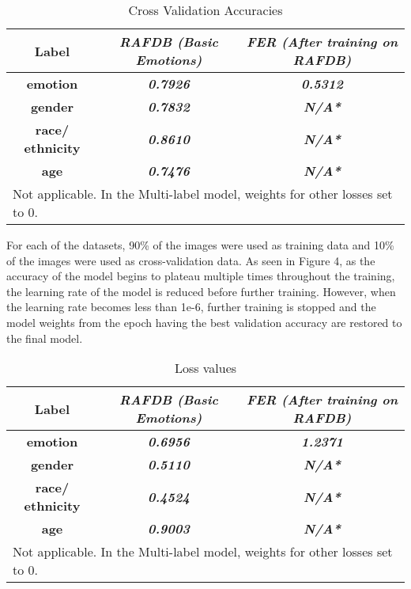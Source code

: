 \documentclass[letterpaper,10pt]{article}
\begin{document}
\begin{table}[htbp]

\begin{center}
\begin{tabular}{|c|c|c|}

\hline

\textbf{Label} & \textbf{\textit{RAFDB
 (Basic Emotions)}}& \textbf{\textit{FER (After training on RAFDB)}} \\
\hline
\textbf{emotion} & \textbf{\textit{0.7926}}& \textbf{\textit{0.5312}} \\
\hline
\textbf{gender} & \textbf{\textit{0.7832}}& \textbf{\textit{N/A*}} \\
\hline
\textbf{race/ ethnicity} & \textbf{\textit{0.8610 }}& \textbf{\textit{N/A*}} \\
\hline
\textbf{age} & \textbf{\textit{0.7476 }}& \textbf{\textit{N/A*}} \\
\hline
\multicolumn{3}{l}{Not applicable. In the Multi-label model, weights for other losses set to 0.
}

\end{tabular}
\label{tab1}
\end{center}
\caption{Cross Validation Accuracies}
\end{table}
For each of the datasets, 90\% of the images were used as training data and 10\% of the images were used as cross-validation data. As seen in Figure 4, as the accuracy of the model begins to plateau multiple times throughout the training, the learning rate of the model is reduced before further training. However, when the learning rate becomes less than 1e-6, further training is stopped and the model weights from the epoch having the best validation accuracy are restored to the final model.
\begin{table}[htbp]

\begin{center}
\begin{tabular}{|c|c|c|}

\hline

\textbf{Label} & \textbf{\textit{RAFDB
 (Basic Emotions)}}& \textbf{\textit{FER (After training on RAFDB)}} \\
\hline
\textbf{emotion} & \textbf{\textit{0.6956}}& \textbf{\textit{1.2371}} \\
\hline
\textbf{gender} & \textbf{\textit{0.5110}}& \textbf{\textit{N/A*}} \\
\hline
\textbf{race/ ethnicity} & \textbf{\textit{0.4524}}& \textbf{\textit{N/A*}} \\
\hline
\textbf{age} & \textbf{\textit{0.9003}}& \textbf{\textit{N/A*}} \\
\hline
\multicolumn{3}{l}{Not applicable. In the Multi-label model, weights for other losses set to 0.
}

\end{tabular}
\label{tab1e}
\end{center}
\caption{Loss values}
\end{table}
\end{document}
